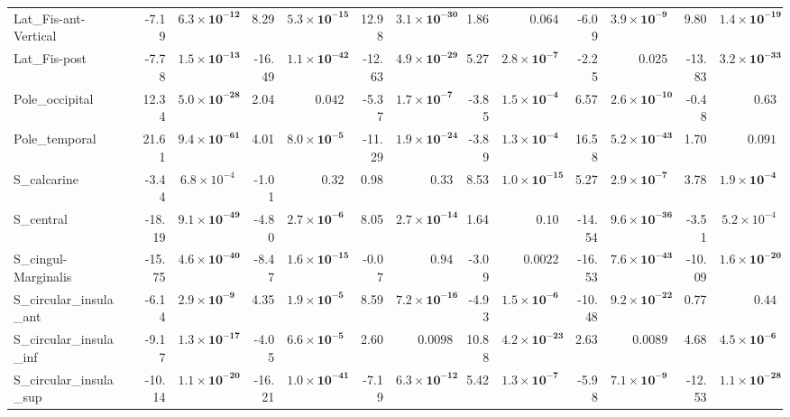 {\begin{longtable}{llrrrrrrrrrrrr}
Lat\_Fis-ant-Vertical &  & -7.19 & $\mathbf{6.3{\times}10^{-12}}$ & 8.29 & $\mathbf{5.3{\times}10^{-15}}$ & 12.98 & $\mathbf{3.1{\times}10^{-30}}$ & 1.86 & $0.064$ & -6.09 & $\mathbf{3.9{\times}10^{-9}}$ & 9.80 & $\mathbf{1.4{\times}10^{-19}}$ \\
Lat\_Fis-post &  & -7.78 & $\mathbf{1.5{\times}10^{-13}}$ & -16.49 & $\mathbf{1.1{\times}10^{-42}}$ & -12.63 & $\mathbf{4.9{\times}10^{-29}}$ & 5.27 & $\mathbf{2.8{\times}10^{-7}}$ & -2.25 & $0.025$ & -13.83 & $\mathbf{3.2{\times}10^{-33}}$ \\
Pole\_occipital &  & 12.34 & $\mathbf{5.0{\times}10^{-28}}$ & 2.04 & $0.042$ & -5.37 & $\mathbf{1.7{\times}10^{-7}}$ & -3.85 & $\mathbf{1.5{\times}10^{-4}}$ & 6.57 & $\mathbf{2.6{\times}10^{-10}}$ & -0.48 & $0.63$ \\
Pole\_temporal &  & 21.61 & $\mathbf{9.4{\times}10^{-61}}$ & 4.01 & $\mathbf{8.0{\times}10^{-5}}$ & -11.29 & $\mathbf{1.9{\times}10^{-24}}$ & -3.89 & $\mathbf{1.3{\times}10^{-4}}$ & 16.58 & $\mathbf{5.2{\times}10^{-43}}$ & 1.70 & $0.091$ \\
S\_calcarine &  & -3.44 & $6.8{\times}10^{-4}$ & -1.01 & $0.32$ & 0.98 & $0.33$ & 8.53 & $\mathbf{1.0{\times}10^{-15}}$ & 5.27 & $\mathbf{2.9{\times}10^{-7}}$ & 3.78 & $\mathbf{1.9{\times}10^{-4}}$ \\
S\_central &  & -18.19 & $\mathbf{9.1{\times}10^{-49}}$ & -4.80 & $\mathbf{2.7{\times}10^{-6}}$ & 8.05 & $\mathbf{2.7{\times}10^{-14}}$ & 1.64 & $0.10$ & -14.54 & $\mathbf{9.6{\times}10^{-36}}$ & -3.51 & $5.2{\times}10^{-4}$ \\
S\_cingul-Marginalis &  & -15.75 & $\mathbf{4.6{\times}10^{-40}}$ & -8.47 & $\mathbf{1.6{\times}10^{-15}}$ & -0.07 & $0.94$ & -3.09 & $0.0022$ & -16.53 & $\mathbf{7.6{\times}10^{-43}}$ & -10.09 & $\mathbf{1.6{\times}10^{-20}}$ \\
S\_circular\_insula\_ant &  & -6.14 & $\mathbf{2.9{\times}10^{-9}}$ & 4.35 & $\mathbf{1.9{\times}10^{-5}}$ & 8.59 & $\mathbf{7.2{\times}10^{-16}}$ & -4.93 & $\mathbf{1.5{\times}10^{-6}}$ & -10.48 & $\mathbf{9.2{\times}10^{-22}}$ & 0.77 & $0.44$ \\
S\_circular\_insula\_inf &  & -9.17 & $\mathbf{1.3{\times}10^{-17}}$ & -4.05 & $\mathbf{6.6{\times}10^{-5}}$ & 2.60 & $0.0098$ & 10.88 & $\mathbf{4.2{\times}10^{-23}}$ & 2.63 & $0.0089$ & 4.68 & $\mathbf{4.5{\times}10^{-6}}$ \\
S\_circular\_insula\_sup &  & -10.14 & $\mathbf{1.1{\times}10^{-20}}$ & -16.21 & $\mathbf{1.0{\times}10^{-41}}$ & -7.19 & $\mathbf{6.3{\times}10^{-12}}$ & 5.42 & $\mathbf{1.3{\times}10^{-7}}$ & -5.98 & $\mathbf{7.1{\times}10^{-9}}$ & -12.53 & $\mathbf{1.1{\times}10^{-28}}$ \\

\end{longtable}}
